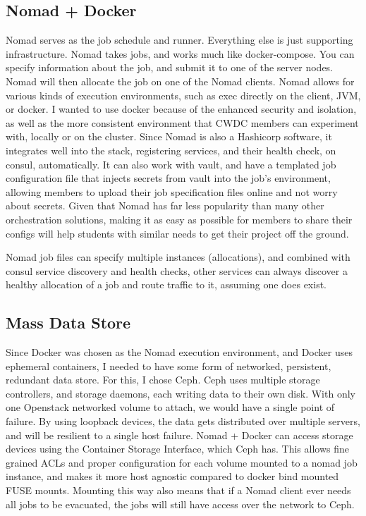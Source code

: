 \documentclass{article}
\begin{document}
\subsection{Nomad + Docker}
Nomad serves as the job schedule and runner. Everything else is just supporting infrastructure. Nomad takes jobs, and works much like docker-compose. You can specify information about the job, and submit it to one of the server nodes. Nomad will then allocate the job on one of the Nomad clients. Nomad allows for various kinds of execution environments, such as exec directly on the client, JVM, or docker. I wanted to use docker because of the enhanced security and isolation, as well as the more consistent environment that CWDC members can experiment with, locally or on the cluster. Since Nomad is also a Hashicorp software, it integrates well into the stack, registering services, and their health check, on consul, automatically. It can also work with vault, and have a templated job configuration file that injects secrets from vault into the job's environment, allowing members to upload their job specification files online and not worry about secrets. Given that Nomad has far less popularity than many other orchestration solutions, making it as easy as possible for members to share their configs will help students with similar needs to get their project off the ground.

Nomad job files can specify multiple instances (allocations), and combined with consul service discovery and health checks, other services can always discover a healthy allocation of a job and route traffic to it, assuming one does exist. 
\subsection{Mass Data Store}
Since Docker was chosen as the Nomad execution environment, and Docker uses ephemeral containers, I needed to have some form of networked, persistent, redundant data store. For this, I chose Ceph. Ceph uses multiple storage controllers, and storage daemons, each writing data to their own disk. With only one Openstack networked volume to attach, we would have a single point of failure. By using loopback devices, the data gets distributed over multiple servers, and will be resilient to a single host failure. Nomad + Docker can access storage devices using the Container Storage Interface, which Ceph has. This allows fine grained ACLs and proper configuration for each volume mounted to a nomad job instance, and makes it more host agnostic compared to docker bind mounted FUSE mounts. Mounting this way also means that if a Nomad client ever needs all jobs to be evacuated, the jobs will still have access over the network to Ceph.
\end{document}
